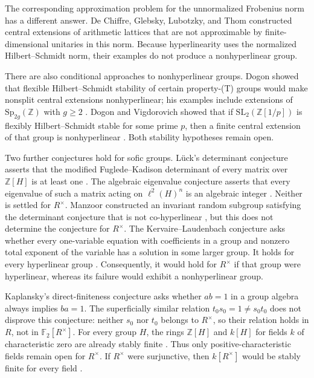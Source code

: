 \documentclass[10pt]{article}
\newcommand{\F}{\mathbb{F}}
\newcommand{\Z}{\mathbb{Z}}
\begin{document}
The corresponding approximation problem for the unnormalized Frobenius norm has a different answer. De Chiffre, Glebsky, Lubotzky, and Thom \cite{DCGLT20} constructed central extensions of arithmetic lattices that are not approximable by finite-dimensional unitaries in this norm. Because hyperlinearity uses the normalized Hilbert--Schmidt norm, their examples do not produce a nonhyperlinear group.

There are also conditional approaches to nonhyperlinear groups. Dogon showed that flexible Hilbert--Schmidt stability of certain property-(T) groups would make nonsplit central extensions nonhyperlinear; his examples include extensions of $\mathrm{Sp}_{2g}(\Z)$ with $g\geq 2$ \cite{Dog23}. Dogon and Vigdorovich showed that if $\mathrm{SL}_2(\Z[1/p])$ is flexibly Hilbert--Schmidt stable for some prime $p$, then a finite central extension of that group is nonhyperlinear \cite{DV26}. Both stability hypotheses remain open.

Two further conjectures hold for sofic groups. Lück's determinant conjecture asserts that the modified Fuglede--Kadison determinant of every matrix over $\Z[H]$ is at least one \cite{ES05}. The algebraic eigenvalue conjecture asserts that every eigenvalue of such a matrix acting on $\ell^2(H)^n$ is an algebraic integer \cite{Tho08}. Neither is settled for $R^\times$. Manzoor constructed an invariant random subgroup satisfying the determinant conjecture that is not co-hyperlinear \cite{Man25}, but this does not determine the conjecture for $R^\times$. The Kervaire--Laudenbach conjecture asks whether every one-variable equation with coefficients in a group and nonzero total exponent of the variable has a solution in some larger group. It holds for every hyperlinear group \cite[Theorem~1.3]{NT22}. Consequently, it would hold for $R^\times$ if that group were hyperlinear, whereas its failure would exhibit a nonhyperlinear group.

Kaplansky's direct-finiteness conjecture asks whether $ab=1$ in a group algebra always implies $ba=1$. The superficially similar relation $t_0s_0=1\neq s_0t_0$ does not disprove this conjecture: neither $s_0$ nor $t_0$ belongs to $R^\times$, so their relation holds in $R$, not in $\F_2[R^\times]$. For every group $H$, the rings $\Z[H]$ and $k[H]$ for fields $k$ of characteristic zero are already stably finite \cite[Theorem~3.4 and Corollary~3.5]{BFF24}. Thus only positive-characteristic fields remain open for $R^\times$. If $R^\times$ were surjunctive, then $k[R^\times]$ would be stably finite for every field \cite[Corollary~3.25]{BFF24}.
\end{document}
